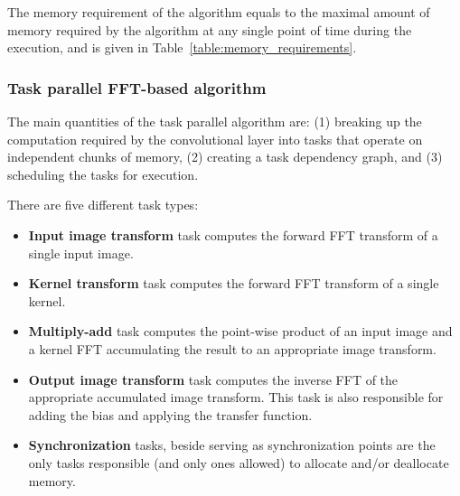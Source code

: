 \documentclass[conference]{./IEEEtran}
\begin{document}
  The memory requirement of the algorithm equals to the maximal amount
  of memory required by the algorithm at any single point of time
  during the execution, and is given in
  Table~\ref{table:memory_requirements}.

\subsubsection{Task parallel FFT-based algorithm}

  The main quantities of the task parallel algorithm are: (1) breaking
  up the computation required by the convolutional layer into tasks
  that operate on independent chunks of memory, (2) creating a task
  dependency graph, and (3) scheduling the tasks for execution.

  There are five different task types:

  {\color{zblack}}

  \begin{itemize}
    \item {\color{zred}\bf Input image transform} task computes the
      forward FFT transform of a single input image.
    \item {\color{zblue}\bf Kernel transform} task computes the forward
      FFT transform of a single kernel.
    \item {\color{zgreen}\bf Multiply-add} task computes the
      point-wise product of an input image and a kernel FFT
      accumulating the result to an appropriate image transform.
    \item {\color{zpurple}\bf Output image transform} task computes
      the inverse FFT of the appropriate accumulated image transform.
      This task is also responsible for adding the bias and applying
      the transfer function.
    \item {\color{zyellow}\bf Synchronization} tasks, beside serving
      as synchronization points are the only tasks responsible (and
      only ones allowed) to allocate and/or deallocate memory.
  \end{itemize}

  {\color{zblack}}
\end{document}
